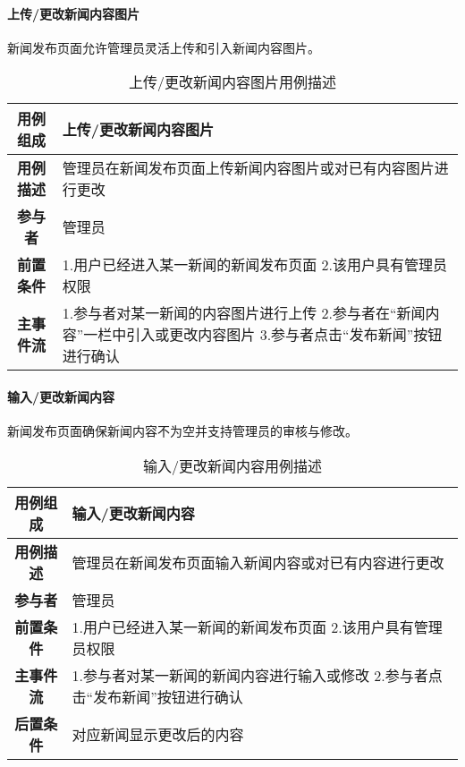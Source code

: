 \paragraph{上传/更改新闻内容图片}

新闻发布页面允许管理员灵活上传和引入新闻内容图片。\\

\begin{table}[H]
	\centering
	\caption{上传/更改新闻内容图片用例描述}
	\renewcommand\arraystretch{1.5}
	\begin{tabular}{|c|>{\raggedright\arraybackslash}p{10cm}|}
		\hline
		\textbf{用例组成} & \textbf{上传/更改新闻内容图片}\\
		\hline
		\textbf{用例描述} & 管理员在新闻发布页面上传新闻内容图片或对已有内容图片进行更改\\ 
		\hline
		\textbf{参与者} & 管理员\\
		\hline
		\textbf{前置条件} & 
		1.用户已经进入某一新闻的新闻发布页面\newline
		2.该用户具有管理员权限\\
		\hline
		\textbf{主事件流} & 
		1.参与者对某一新闻的内容图片进行上传\newline
		2.参与者在“新闻内容”一栏中引入或更改内容图片\newline
		3.参与者点击“发布新闻”按钮进行确认\\
		\hline
	\end{tabular}
\end{table}

\paragraph{输入/更改新闻内容}

新闻发布页面确保新闻内容不为空并支持管理员的审核与修改。\\

\begin{table}[H]
	\centering
	\caption{输入/更改新闻内容用例描述}
	\renewcommand\arraystretch{1.5}
	\begin{tabular}{|c|>{\raggedright\arraybackslash}p{10cm}|}
		\hline
		\textbf{用例组成} & \textbf{输入/更改新闻内容}\\
		\hline
		\textbf{用例描述} & 管理员在新闻发布页面输入新闻内容或对已有内容进行更改\\ 
		\hline
		\textbf{参与者} & 管理员\\
		\hline
		\textbf{前置条件} & 
		1.用户已经进入某一新闻的新闻发布页面\newline
		2.该用户具有管理员权限\\
		\hline
		\textbf{主事件流} & 
		1.参与者对某一新闻的新闻内容进行输入或修改\newline
		2.参与者点击“发布新闻”按钮进行确认\\
		\hline
		\textbf{后置条件} & 对应新闻显示更改后的内容\\
		\hline
	\end{tabular}
\end{table}


